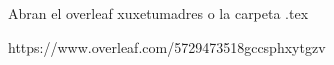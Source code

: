 Abran el overleaf xuxetumadres o la carpeta .tex
    
https://www.overleaf.com/5729473518gccsphxytgzv

